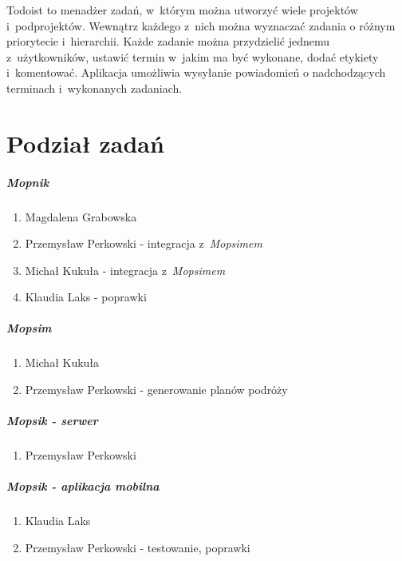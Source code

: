 Todoist to menadżer zadań, w~którym można utworzyć wiele projektów i~podprojektów. Wewnątrz każdego z~nich można wyznaczać zadania o różnym priorytecie i~hierarchii. Każde zadanie można przydzielić jednemu z~użytkowników, ustawić termin w~jakim ma być wykonane, dodać etykiety i~komentować. Aplikacja umożliwia wysyłanie powiadomień o nadchodzących terminach i~wykonanych zadaniach.


\chapter{Podział zadań}
\paragraph{Mopnik}
\begin{enumerate}
\item Magdalena Grabowska
\item Przemysław Perkowski - integracja z~\textit{Mopsimem}
\item Michał Kukuła - integracja z~\textit{Mopsimem}
\item Klaudia Laks - poprawki
\end{enumerate}

\paragraph{Mopsim}
\begin{enumerate}
\item Michał Kukuła
\item Przemysław Perkowski - generowanie planów podróży
\end{enumerate}

\paragraph{Mopsik - serwer}
\begin{enumerate}
\item Przemysław Perkowski
\end{enumerate}

\paragraph{Mopsik - aplikacja mobilna}
\begin{enumerate}
\item Klaudia Laks
\item Przemysław Perkowski - testowanie, poprawki
\end{enumerate}


